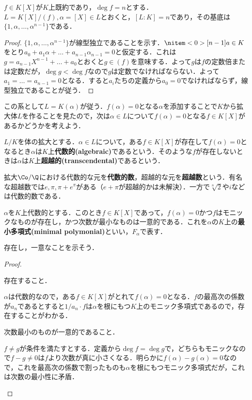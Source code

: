 \begin{prop}\label{prop:既約多項式の商による拡大}
	$f\in K[X]$が$K$上既約であり，$\deg f=n$とする．$L=K[X]/(f),\alpha=[X]\in L$とおくと，$[L:K]=n$であり，その基底は$\{1,\alpha,\dots,\alpha^{n-1}\}$である．
\end{prop}

\begin{proof}
	$\{1,\alpha,\dots,\alpha^{n-1}\}$が線型独立であることを示す．$\nitem<0>[n-1]{a}\in K$をとり$a_0+a_1\alpha+\dots+a_{n-1}\alpha_{n-1}=0$と仮定する．これは$g=a_{n-1}X^{n-1}+\dots+a_0$とおくと$g\in (f)$を意味する．よって$g$は$f$の定数倍または定数だが，$\deg g<\deg f$なので$g$は定数でなければならない．よって$a_1=\dots=a_{n-1}=0$となる．すると$a_i$たちの定義から$a_0=0$でなければならず，線型独立であることが従う．
\end{proof}

この系として$L= K(\alpha)$が従う．$f(\alpha)=0$となる$\alpha$を添加することで$K$から拡大体$L$を作ることを見たので，次は$\alpha\in L$について$f(\alpha)=0$となる$f\in K[X]$があるかどうかを考えよう．

\begin{defi}
	$L/K$を体の拡大とする．$\alpha\in L$について，ある$f\in K[X]$が存在して$f(\alpha)=0$となるとき$\alpha$は$K$上\textbf{代数的(algebraic)}であるという．そのような$f$が存在しないときは$\alpha$は$K$上\textbf{超越的(transcendental)}であるという．
\end{defi}

拡大$\Co/\Q$における代数的な元を\textbf{代数的数}，超越的な元を\textbf{超越数}という．有名な超越数では$e,\pi,\pi+e^\pi$がある（$e+\pi$が超越的かは未解決）．一方で$\sqrt[n]{2}$や$i$などは代数的数である．

\begin{defi}[最小多項式]
	$\alpha$を$K$上代数的とする．このとき$f\in K[X]$であって，$f(\alpha)=0$かつ$f$はモニックなものが存在し，かつ次数が最小なものは一意的である．これを$\alpha$の$K$上の\textbf{最小多項式(minimal polymonial)}といい，$F_\alpha$で表す．
\end{defi}

存在し，一意なことを示そう．
\begin{proof}
	\begin{step}
		\item 存在すること．
		
		$\alpha$は代数的なので，ある$f\in K[X]$がとれて$f(\alpha)=0$となる．$f$の最高次の係数が$a_n$であるとすると$1/a_n\cdot f$は$\alpha$を根にもつ$K$上のモニック多項式であるので，存在することがわかる．
		
		\item 次数最小のものが一意的であること．
		
		$f\neq g$が条件を満たすとする．定義から$\deg f=\deg g$で，どちらもモニックなので$f-g\neq0 $は$f$より次数が真に小さくなる．明らかに$f(\alpha)-g(\alpha)=0$なので，これを最高次の係数で割ったものも$\alpha$を根にもつモニック多項式だが，これは次数の最小性に矛盾．
	\end{step}
\end{proof}


